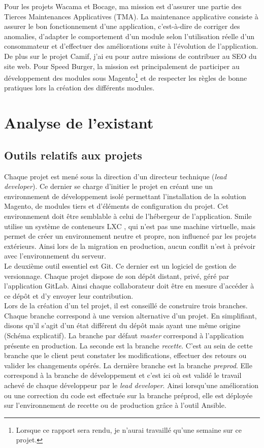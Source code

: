 \documentclass[12pt, a4paper, twoside]{report}
\begin{document}
Pour les projets Wacama et Bocage, ma mission est d'assurer une partie des Tierces Maintenances Applicatives (TMA). La maintenance applicative consiste à assurer le bon fonctionnement d'une application, c'est-à-dire de corriger des anomalies, d'adapter le comportement d'un module selon l'utilisation réelle d'un consommateur et d'effectuer des améliorations suite à l'évolution de l'application. De plus sur le projet Camif, j'ai eu pour autre missions de contribuer au SEO du site web. Pour Speed Burger, la mission est principalement de participer au développement des modules sous Magento\footnote{Lorsque ce rapport sera rendu, je n'aurai travaillé qu'une semaine sur ce projet.} et de respecter les règles de bonne pratiques lors la création des différents modules. 

\chapter{Analyse de l'existant}

\section{Outils relatifs aux projets}

Chaque projet est mené sous la direction d'un directeur technique (\textit{lead developer}). Ce dernier se charge d'initier le projet en créant une un environnement de développement isolé permettant l'installation de la solution Magento, de modules tiers et d'éléments de configuration du projet. Cet environnement doit être semblable à celui de l'hébergeur de l'application. Smile utilise un système de conteneurs LXC , qui n'est pas une machine virtuelle, mais permet de créer un environnement neutre et propre, non influencé par les projets extérieurs. Ainsi lors de la migration en production, aucun conflit n'est à prévoir avec l'environnement du serveur. \\

Le deuxième outil essentiel est Git. Ce dernier est un logiciel de gestion de versionnage. Chaque projet dispose de son dépôt distant, privé, géré par l'application GitLab. Ainsi chaque collaborateur doit être en mesure d'accéder à ce dépôt et d'y envoyer leur contribution.  \\

Lors de la création d'un tel projet, il est conseillé de construire trois branches. Chaque branche correspond à une version alternative d'un projet. En simplifiant, disons qu'il s'agit d'un état différent du dépôt mais ayant une même origine (Schéma explicatif). La branche par défaut \textit{master} correspond à l'application présente en production. La seconde est la branche \textit{recette}. C'est au sein de cette branche que le client peut constater les modifications, effectuer des retours ou valider les changements opérés. La dernière branche est la branche \textit{preprod}. Elle correspond à la branche de développement et c'est ici où est validé le travail achevé de chaque développeur par le \textit{lead developer}. Ainsi lorsqu'une amélioration ou une correction du code est effectuée sur la branche préprod, elle est déployée sur l'environnement de recette ou de production grâce à l'outil Ansible. \\
\end{document}
